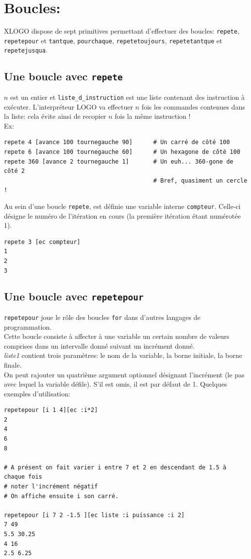 \section{Boucles:}
 XLOGO dispose de sept primitives permettant d'effectuer des boucles: \texttt{repete}, \texttt{repetepour} et \texttt{tantque}, \texttt{pourchaque}, \texttt{repetetoujours}, \texttt{repetetantque} et \texttt{repetejusqua}.
\subsection{Une boucle avec \texttt{repete}}
\noindent {}
$n$ est un entier et \texttt{liste\_d\_instruction} est une liste contenant des instruction à exécuter. L'interpréteur LOGO va effectuer $n$ fois les commandes contenues dans la liste: cela évite ainsi de recopier $n$ fois la même instruction !\\
Ex:
\begin{verbatim}
repete 4 [avance 100 tournegauche 90]      # Un carré de côté 100
repete 6 [avance 100 tournegauche 60]      # Un hexagone de côté 100
repete 360 [avance 2 tournegauche 1]       # Un euh... 360-gone de côté 2
                                           # Bref, quasiment un cercle !
\end{verbatim}
\noindent {}
Au sein d'une boucle \texttt{repete}, est définie une variable interne \texttt{compteur}. Celle-ci désigne le numéro de l'itération en cours (la première itération étant numérotée 1).
\begin{verbatim}
repete 3 [ec compteur]
1
2
3

\end{verbatim}
\subsection{Une boucle avec \texttt{repetepour}}
\noindent \texttt{repetepour} joue le rôle des boucles \texttt{for} dans d'autres langages de programmation. \\
Cette boucle consiste à affecter à une variable un certain nombre de valeurs comprises dans un intervalle donné suivant un incrément donné. \\
\textit{liste1} contient trois paramètres: le nom de la variable, la borne initiale, la borne finale.\\
On peut rajouter un quatrième argument optionnel désignant l'incrément (le pas avec lequel la variable défile). S'il est omis, il est par défaut de 1. Quelques exemples d'utilisation:
\begin{verbatim}
repetepour [i 1 4][ec :i*2]
2
4
6
8

# A présent on fait varier i entre 7 et 2 en descendant de 1.5 à chaque fois
# noter l'incrément négatif
# On affiche ensuite i son carré.

repetepour [i 7 2 -1.5 ][ec liste :i puissance :i 2] 
7 49
5.5 30.25
4 16
2.5 6.25
\end{verbatim}
